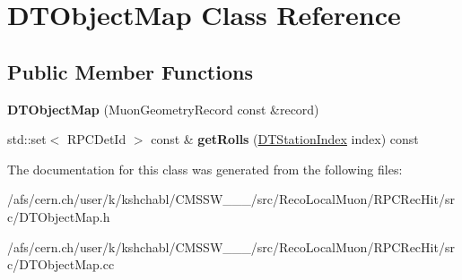 \hypertarget{classDTObjectMap}{\section{D\-T\-Object\-Map Class Reference}
\label{classDTObjectMap}
}
\subsection*{Public Member Functions}
\begin{DoxyCompactItemize}
\item 
\hypertarget{classDTObjectMap_a4e411b54cd9f67eada834cca384c7410}{{\bfseries D\-T\-Object\-Map} (Muon\-Geometry\-Record const \&record)}\label{classDTObjectMap_a4e411b54cd9f67eada834cca384c7410}

\item 
\hypertarget{classDTObjectMap_a76d0448c6fed926554388001b4077758}{std\-::set$<$ R\-P\-C\-Det\-Id $>$ const \& {\bfseries get\-Rolls} (\hyperlink{classDTStationIndex}{D\-T\-Station\-Index} index) const }\label{classDTObjectMap_a76d0448c6fed926554388001b4077758}

\end{DoxyCompactItemize}


The documentation for this class was generated from the following files\-:\begin{DoxyCompactItemize}
\item 
/afs/cern.\-ch/user/k/kshchabl/\-C\-M\-S\-S\-W\-\_\-\_\-\_/src/\-Reco\-Local\-Muon/\-R\-P\-C\-Rec\-Hit/src/D\-T\-Object\-Map.\-h\item 
/afs/cern.\-ch/user/k/kshchabl/\-C\-M\-S\-S\-W\-\_\-\_\-\_/src/\-Reco\-Local\-Muon/\-R\-P\-C\-Rec\-Hit/src/D\-T\-Object\-Map.\-cc\end{DoxyCompactItemize}

